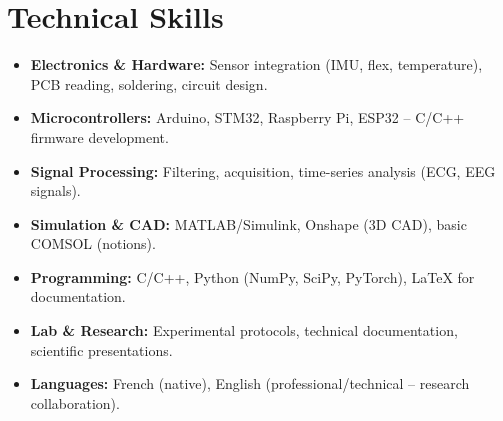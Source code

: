 \documentclass[a4paper,11pt]{article}
\begin{document}
\section{Technical Skills}
\begin{itemize}[leftmargin=*, nosep]
    \item \small{\textbf{Electronics \& Hardware:} Sensor integration (IMU, flex, temperature), PCB reading, soldering, circuit design.}
    \item \small{\textbf{Microcontrollers:} Arduino, STM32, Raspberry Pi, ESP32 -- C/C++ firmware development.}
    \item \small{\textbf{Signal Processing:} Filtering, acquisition, time-series analysis (ECG, EEG signals).}
    \item \small{\textbf{Simulation \& CAD:} MATLAB/Simulink, Onshape (3D CAD), basic COMSOL (notions).}
    \item \small{\textbf{Programming:} C/C++, Python (NumPy, SciPy, PyTorch), LaTeX for documentation.}
    \item \small{\textbf{Lab \& Research:} Experimental protocols, technical documentation, scientific presentations.}
    \item \small{\textbf{Languages:} French (native), English (professional/technical -- research collaboration).}
\end{itemize}

\end{document}
